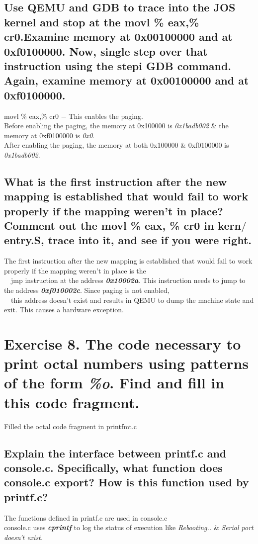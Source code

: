 \documentclass[a4paper]{article}
\begin{document}
		\subsection{Use QEMU and GDB to trace into the JOS kernel and stop at the movl \% eax,\% cr0.Examine memory at 0x00100000 and at 0xf0100000. Now, single step over that instruction using the stepi GDB command. Again, examine memory at 0x00100000 and at 0xf0100000.}
		\qquad \textbullet \quad  movl \% eax,\% cr0 $-$ This enables the paging. \\ 
		\qquad \textbullet \quad Before enabling the paging, the memory at 0x100000 is \emph{0x1badb002} \& the memory at 0xf0100000 is \emph{0x0}. \\
		\qquad \textbullet \quad After enabling the paging, the memory at both 0x100000 \& 0xf0100000 is \emph{0x1badb002}.
		 \subsection{What is the first instruction after the new mapping is established that would fail to work properly if the mapping weren't in place? Comment out the movl \% eax, \% cr0 in kern$/$entry.S, trace into it, and see if you were right.}
		 \qquad \textbullet \quad The first instruction after the new mapping is established that would fail to work properly if the mapping weren't in place is the \\ \qquad \quad ~~jmp instruction at the address \emph{\textbf{0x10002a}}. This instruction needs to jump to the address \emph{\textbf{0xf010002c}}. Since paging is not enabled, \\ \qquad \quad ~~this address doesn't exist and results in QEMU to dump the machine state and exit. This causes a hardware exception.
		 \section{Exercise 8. The code necessary to print octal numbers using patterns of the form \emph{\%o}. Find and fill in this code fragment.}
		 \textbullet \quad Filled the octal code fragment in printfmt.c \\
		 \subsection{Explain the interface between printf.c and console.c. Specifically, what function does console.c export? How is this function used by printf.c? }
		 \qquad \textbullet \quad The functions defined in printf.c are used in console.c \\
		 \qquad \textbullet \quad console.c uses \emph{\textbf{cprintf}} to log the status of execution like \emph{Rebooting..} \& \emph{Serial port doesn't exist.}
\end{document}
